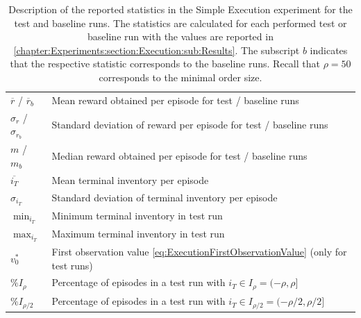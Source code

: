 \documentclass[
    a4paper,
    11pt,
    bibliography=totoc,
    listof=totoc,      
    headinclude=true,
    cleardoublepage=empty,
]{scrbook}
\theoremstyle{plain}
\theoremstyle{definition}
\theoremstyle{remark}
\begin{document}
\begin{table}[htpb!]
    \centering
    \caption[%
        Description of reported test statistics in the Simple Execution
        Experiment
    ]{
        Description of the reported statistics in the Simple Execution
        experiment for the test and baseline runs. The statistics are 
        calculated for each performed test or baseline run with the values 
        are reported in 
        \cref{chapter:Experiments:section:Execution:sub:Results}. The 
        subscript $b$ indicates that the respective statistic corresponds 
        to the baseline runs. Recall that $\rho=50$ corresponds to the minimal
        order size.
    }
    \label{tab:ExecutionTestStatistics}        
    \begin{tabularx}{\textwidth}{>{\centering}m{3.5cm}X}
        \toprule
        ${\overline r}$ / ${\overline r_b}$ & Mean reward obtained per episode
            for test / baseline runs \\
        ${\sigma_r}$ / ${\sigma_{r_b}}$ & Standard deviation of reward per
            episode for test / baseline runs \\
        $ m$ / ${m_b}$ & Median reward obtained per episode for 
            test / baseline runs\\
        ${\overline{i_T}}$ & Mean terminal inventory per episode \\
        ${\sigma_{i_T}}$ & 
            Standard deviation of terminal inventory per episode \\
        ${\min_{i_T}}$ & Minimum terminal inventory in test run \\
        ${\max_{i_T}}$ & Maximum terminal inventory in test run \\
        ${v^*_0}$ & First observation value
            \eqref{eq:ExecutionFirstObservationValue} (only for test runs) \\
        $\%I_\rho$ & Percentage of episodes in a test run with 
            $i_T\in I_\rho = (-\rho, \rho]$ \\
        $\%I_{\rho/2}$ & Percentage of episodes in a test run with 
            $i_T\in I_{\rho/2} = (-\rho/2, \rho/2]$ \\
        \bottomrule
    \end{tabularx}
\end{table}
\end{document}
